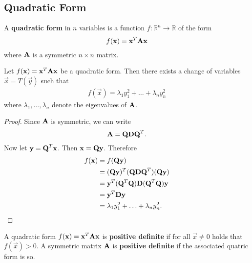 \documentclass{memoir}
\begin{document}
\subsection{Quadratic Form}
\begin{definition}
    A \textbf{quadratic form} in $n$ variables is a function $f: \mathbb{R}^n \to \mathbb{R}$ of the form
    \begin{align*}
        f(\boldsymbol{\mathbf{x}}) = \boldsymbol{\mathbf{x}}^T \boldsymbol{\mathbf{A}} \boldsymbol{\mathbf{x}}
    \end{align*}
    where $\boldsymbol{\mathbf{A}}$ is a symmetric $n \times n$ matrix.
\end{definition}

\begin{theorem}
    Let $f(\boldsymbol{\mathbf{x}})=\boldsymbol{\mathbf{x}}^T \boldsymbol{\mathbf{A}} \boldsymbol{\mathbf{x}}$ be a quadratic form. Then there exists a change of variables $\vec{x} = T(\vec{y})$ such that
    \begin{align*}
        f(\vec{x}) = \lambda_1 y_1^2 + \ldots + \lambda_n y_n^2
    \end{align*}
    where $\lambda_1, \ldots, \lambda_n$ denote the eigenvalues of $\boldsymbol{\mathbf{A}}$.
\end{theorem}
\begin{proof}
    Since $\boldsymbol{\mathbf{A}}$ is symmetric, we can write
    \begin{align*}
        \boldsymbol{\mathbf{A}} = \boldsymbol{\mathbf{Q}} \boldsymbol{\mathbf{D}} \boldsymbol{\mathbf{Q}}^T.
    \end{align*}
    Now let $\boldsymbol{\mathbf{y}} = \boldsymbol{\mathbf{Q}}^T \boldsymbol{\mathbf{x}}$. Then $\boldsymbol{\mathbf{x}} = \boldsymbol{\mathbf{Q}} \boldsymbol{\mathbf{y}}$. Therefore
    \begin{align*}
        f(\boldsymbol{\mathbf{x}}) &= f(\boldsymbol{\mathbf{Q}} \boldsymbol{\mathbf{y}}) \\
        &= (\boldsymbol{\mathbf{Q}} \boldsymbol{\mathbf{y}})^T (\boldsymbol{\mathbf{Q}} \boldsymbol{\mathbf{D}} \boldsymbol{\mathbf{Q}}^T) (\boldsymbol{\mathbf{Q}} \boldsymbol{\mathbf{y}}) \\
        &= \boldsymbol{\mathbf{y}}^T (\boldsymbol{\mathbf{Q}}^T \boldsymbol{\mathbf{Q}}) \boldsymbol{\mathbf{D}} (\boldsymbol{\mathbf{Q}}^T \boldsymbol{\mathbf{Q}}) \boldsymbol{\mathbf{y}} \\
        &= \boldsymbol{\mathbf{y}}^T \boldsymbol{\mathbf{D}} \boldsymbol{\mathbf{y}} \\
        &= \lambda_1 y_1^2 + \ldots + \lambda_n y_n^2.
    \end{align*}
\end{proof}

\begin{definition}
    A quadratic form $f(\boldsymbol{\mathbf{x}}) = \boldsymbol{\mathbf{x}}^T \boldsymbol{\mathbf{A}} \boldsymbol{\mathbf{x}}$ is \textbf{positive definite} if for all $\vec{x} \neq 0$ holds that $f(\vec{x}) > 0$. A symmetric matrix $\boldsymbol{\mathbf{A}}$ is \textbf{positive definite} if the associated quatric form is so.
\end{definition}
\end{document}
